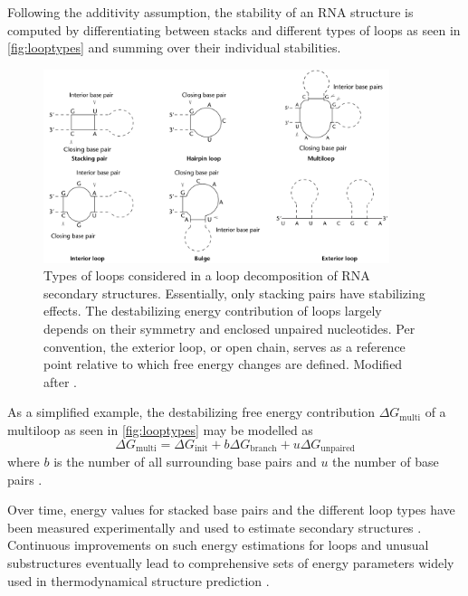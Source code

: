 \documentclass[../../master.tex]{subfiles}
\begin{document}
Following the additivity assumption, the stability of an RNA structure is computed by differentiating between stacks and different types of loops as seen in \autoref{fig:looptypes} and summing over their individual stabilities.

\begin{figure}[!ht]
	\centering
	\includegraphics[width=0.9\textwidth]{pic/intro/notmine/hofacker2005_fig2mod.png}
	\caption[Loop Types]{Types of loops considered in a loop decomposition of RNA secondary structures.
		Essentially, only stacking pairs have stabilizing effects.
		The destabilizing energy contribution of loops largely depends on their symmetry and enclosed unpaired nucleotides.
		Per convention, the exterior loop, or open chain, serves as a reference point relative to which free energy changes are defined.
		Modified after \parencite[Figure 2]{hofacker_rna_2005}.
	}\label{fig:looptypes}
\end{figure}
\newpage
As a simplified example, the destabilizing free energy contribution $\Delta G_\mathrm{multi}$ of a multiloop as seen in \autoref{fig:looptypes} may be modelled as
\begin{equation}\label{eq:multi}
	\Delta G_\mathrm{multi} = \Delta G_\mathrm{init} + b \Delta G_\mathrm{branch} + u \Delta G_\mathrm{unpaired}
\end{equation}
where $b$ is the number of all surrounding base pairs and $u$ the number of base pairs \parencite{dirks_partition_2003}.

Over time, energy values for stacked base pairs and the different loop types have been measured experimentally and used to estimate secondary structures \parencite{tinoco_estimation_1971, tinoco_improved_1973}.
Continuous improvements on such energy estimations for loops and unusual substructures eventually lead to comprehensive sets of energy parameters widely used in thermodynamical structure prediction \parencite{turner_nndb_2010}.
\end{document}
